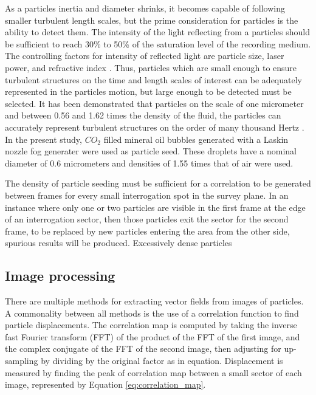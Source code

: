 As a particles inertia and diameter shrinks, it becomes capable of following 
smaller turbulent length scales, but the prime consideration for particles is 
the ability to detect them. The intensity of the light reflecting from a 
particles should be sufficient to reach 30\% to 50\% of the saturation level of 
the recording medium. The controlling factors for intensity of reflected light 
are particle size, laser power, and refractive index \cite{adrian2011}. Thus, 
particles which are small enough to ensure turbulent structures on the time and 
length scales of interest can be adequately represented in the particles 
motion, but large enough to be detected must be selected. It has been 
demonstrated that particles on the scale of one micrometer and between 0.56 and 
1.62 times the density of the fluid, the particles can accurately represent 
turbulent structures on the order of many thousand Hertz \cite{mei1996}. In the 
present study, $CO_2$ filled mineral oil bubbles generated with a Laskin 
nozzle fog generater were used as particle seed. These droplets have a nominal 
diameter of 0.6 micrometers and densities of 1.55 times that of air were used.

The density of particle seeding must be sufficient for a correlation to be 
generated between frames for every small interrogation spot in the survey 
plane. In an instance where only one or two particles are visible in the first 
frame at the edge of an interrogation sector, then those particles exit the 
sector for the second frame, to be replaced by new particles 
entering the area from the other side, spurious results will be produced. 
Excessively dense particles 


\subsection{Image processing}

There are multiple methods for extracting vector fields from images of 
particles. A commonality between all methods is the use of a correlation 
function to find particle displacements. The correlation map is computed by 
taking the inverse fast Fourier transform (FFT) of the product of the FFT of 
the first image, and the complex conjugate of the FFT of the second image, then 
adjusting for up-sampling by dividing by the original factor as in equation. 
Displacement is measured by finding the peak of correlation map between a small 
sector of each image, represented by Equation \ref{eq:correlation_map}. 

